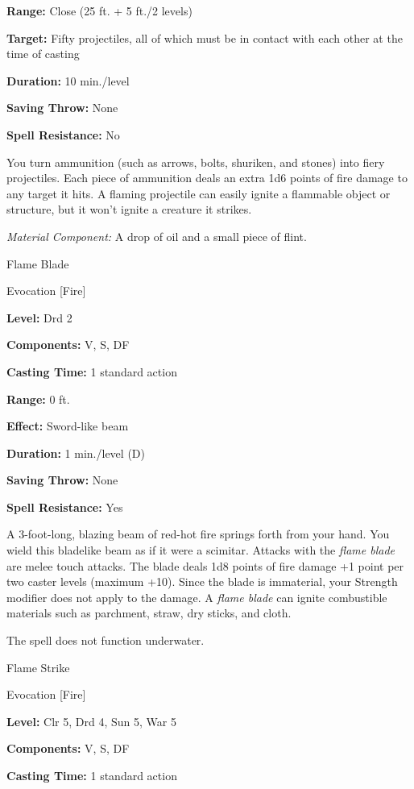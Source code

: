 \documentclass{article}
\begin{document}
\textbf{Range:} Close (25 ft. + 5 ft./2 levels)

\textbf{Target:} Fifty projectiles, all of which must be in contact with each other 
at the time of casting

\textbf{Duration:} 10 min./level

\textbf{Saving Throw:} None

\textbf{Spell Resistance:} No

You turn ammunition (such as arrows, bolts, shuriken, and stones) into fiery projectiles. 
Each piece of ammunition deals an extra 1d6 points of fire damage to any target 
it hits. A flaming projectile can easily ignite a flammable object or structure, 
but it won't ignite a creature it strikes.

\textit{Material Component: }A drop of oil and a small piece of flint.

\vspace{12pt}
Flame Blade

Evocation [Fire]

\textbf{Level:} Drd 2

\textbf{Components:} V, S, DF

\textbf{Casting Time:} 1 standard action

\textbf{Range:} 0 ft.

\textbf{Effect:} Sword-like beam

\textbf{Duration:} 1 min./level (D)

\textbf{Saving Throw:} None

\textbf{Spell Resistance:} Yes

A 3-foot-long, blazing beam of red-hot fire springs forth from your hand. You wield 
this bladelike beam as if it were a scimitar. Attacks with the \textit{flame blade 
}are melee touch attacks. The blade deals 1d8 points of fire damage +1 point per 
two caster levels (maximum +10). Since the blade is immaterial, your Strength modifier 
does not apply to the damage. A \textit{flame blade }can ignite combustible materials 
such as parchment, straw, dry sticks, and cloth.

The spell does not function underwater.

\vspace{12pt}
Flame Strike

Evocation [Fire]

\textbf{Level:} Clr 5, Drd 4, Sun 5, War 5

\textbf{Components:} V, S, DF

\textbf{Casting Time:} 1 standard action
\end{document}
